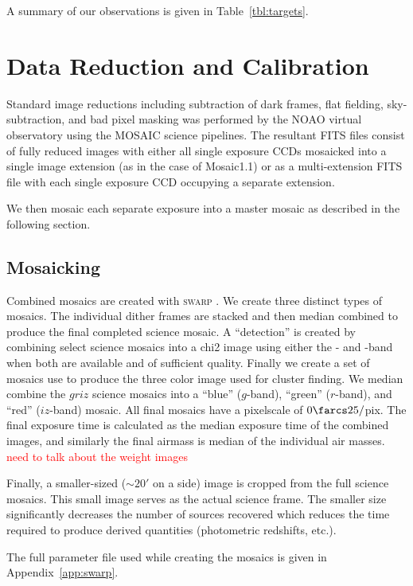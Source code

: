 \documentclass[apj, revtex4]{emulateapj}
\newcommand{\editorial}[1]{\textcolor{red}{#1}}
\begin{document}
A summary of our observations is given in Table~\ref{tbl:targets}.

\section{Data Reduction and Calibration}\label{sec:data reduction}
Standard image reductions including subtraction of dark frames, flat fielding, sky-subtraction, and bad pixel masking was performed by the NOAO virtual observatory using the MOSAIC \citep{Valdes2007} science pipelines. The resultant FITS files consist of fully reduced images with either all single exposure CCDs mosaicked into a single image extension (as in the case of Mosaic1.1) or as a multi-extension FITS file with each single exposure CCD occupying a separate extension.

We then mosaic each separate exposure into a master mosaic as described in the following section.

\subsection{Mosaicking}\label{sec:mosaicks}
Combined mosaics are created with \textsc{swarp} \citep{Bertin2002}. We create three distinct types of mosaics. The individual dither frames are stacked and then median combined to produce the final completed science mosaic. A ``detection'' is created by combining select science mosaics into a chi2 image using either the \sdssi- and \sdssz-band when both are available and of sufficient quality. Finally we create a set of mosaics use to produce the three color image used for cluster finding. We median combine the $griz$ science mosaics into a ``blue'' ($g$-band), ``green'' ($r$-band), and ``red'' ($iz$-band) mosaic. All final mosaics have a pixelscale of $0\farcs25/$pix. The final exposure time is calculated as the median exposure time of the combined images, and similarly the final airmass is median of the individual air masses. \editorial{need to talk about the weight images}

Finally, a smaller-sized ($\sim20'$ on a side) image is cropped from the full science mosaics. This small image serves as the actual science frame. The smaller size significantly decreases the number of sources recovered which reduces the time required to produce derived quantities (photometric redshifts, etc.).

The full parameter file used while creating the mosaics is given in Appendix~\ref{app:swarp}.
\end{document}
